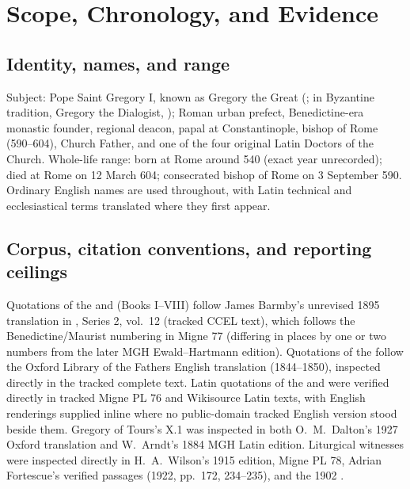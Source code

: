 \section{Scope, Chronology, and Evidence}

\subsection{Identity, names, and range}

Subject: Pope Saint Gregory I, known as Gregory the Great (; in Byzantine tradition, Gregory the Dialogist, );
Roman urban prefect, Benedictine-era monastic founder, regional deacon, papal
 at Constantinople, bishop of Rome (590--604), Church
Father, and one of the four original Latin Doctors of the Church. Whole-life
range: born at Rome around 540 (exact year unrecorded); died at Rome on 12
March 604; consecrated bishop of Rome on 3 September 590. Ordinary English
names are used throughout, with Latin technical and ecclesiastical terms
translated where they first appear.

\subsection{Corpus, citation conventions, and reporting ceilings}

Quotations of the  and  (Books
I--VIII) follow James Barmby's unrevised 1895 translation in , Series 2, vol.~12 (tracked CCEL text), which follows the
Benedictine/Maurist numbering in Migne  77 (differing
in places by one or two numbers from the later MGH Ewald--Hartmann edition).
Quotations of the  follow the Oxford Library of the
Fathers English translation (1844--1850), inspected directly in the tracked
complete text. Latin quotations of the  and
 were verified directly in tracked
Migne PL 76 and Wikisource Latin texts, with English renderings supplied inline
where no public-domain tracked English version stood beside them. Gregory of
Tours's  X.1 was inspected in both O.\ M.\ Dalton's
1927 Oxford translation and W.\ Arndt's 1884 MGH Latin edition. Liturgical
witnesses were inspected directly in H.\ A.\ Wilson's 1915 
edition, Migne PL 78, Adrian Fortescue's verified passages (1922, pp.\ 172,
234--235), and the 1902 .


